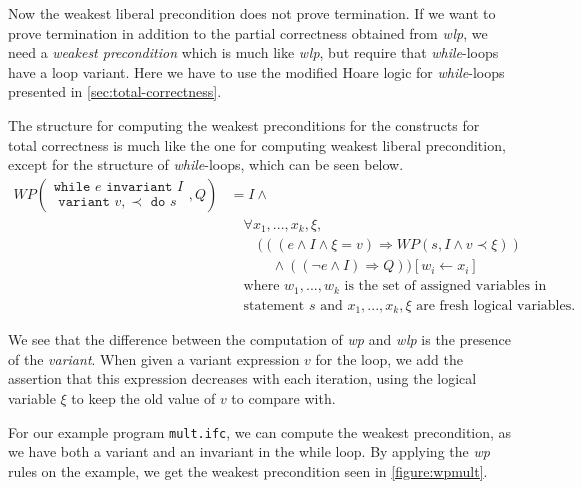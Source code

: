 Now the weakest liberal precondition does not prove termination. If we want to prove termination in addition to the partial correctness obtained from \textit{wlp}, we need a \textit{weakest precondition} which is much like \textit{wlp}, but require that \textit{while}-loops have a loop variant. 
Here we have to use the modified Hoare logic for \textit{while}-loops presented in \ref{sec:total-correctness}.

The structure for computing the weakest preconditions for the constructs for total correctness is much like the one for computing weakest liberal precondition, except for the structure of \textit{while}-loops, which can be seen below.
\begin{equation}\label{eq:wpwhile}
\begin{align*}
	WP\left(
     \begin{array}{c}
     \texttt{while } e \texttt{ invariant } I \\
     \texttt{ variant } v, \prec \texttt{ do } s
     \end{array}
    , Q \right) 
    &= 
		I \land \label{eq:wpwhile} \\
    &\quad \forall x_1, ..., x_k, \xi, \\
    &\quad \quad (((e \land I \land \xi = v) \Rightarrow WP(s, I \land v \prec \xi)) \\
    &\quad \quad \quad \land ((\neg e \land I) \Rightarrow Q)) [w_i \leftarrow x_i] \\
	&\quad \text{where } w_1, ..., w_k \text{ is the set of assigned variables in} \\
  &\quad \text{statement } s \text{ and } x_1, ..., x_k, \xi \text{ are fresh logical variables.}
\end{align*}
\end{equation}

We see that the difference between the computation of \textit{wp} and \textit{wlp} is the presence of the \textit{variant}. When given a variant expression $v$ for the loop, we add the assertion that this expression decreases with each iteration, using the logical variable $\xi$ to keep the old value of $v$ to compare with.

For our example program \texttt{mult.ifc}, we can compute the weakest precondition, as we have both a variant and an invariant in the while loop.
By applying the \textit{wp} rules on the example, we get the weakest precondition seen in \autoref{figure:wpmult}.

